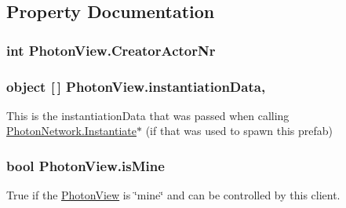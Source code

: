 \subsection{Property Documentation}
\subsubsection[{\texorpdfstring{Creator\+Actor\+Nr}{CreatorActorNr}}]{\setlength{\rightskip}{0pt plus 5cm}int Photon\+View.\+Creator\+Actor\+Nr\hspace{0.3cm}{\ttfamily [get]}}\hypertarget{class_photon_view_aa9d1d25847f25afbac6b68c99c7e286c}{}\label{class_photon_view_aa9d1d25847f25afbac6b68c99c7e286c}
\subsubsection[{\texorpdfstring{instantiation\+Data}{instantiationData}}]{\setlength{\rightskip}{0pt plus 5cm}object \mbox{[}$\,$\mbox{]} Photon\+View.\+instantiation\+Data\hspace{0.3cm}{\ttfamily [get]}, {\ttfamily [set]}}\hypertarget{class_photon_view_a0d1e63579ed533e6394ca7f12b313c7c}{}\label{class_photon_view_a0d1e63579ed533e6394ca7f12b313c7c}


This is the instantiation\+Data that was passed when calling \hyperlink{class_photon_network_a843d9f62d28ab123c83291c1e6bb857d}{Photon\+Network.\+Instantiate}$\ast$ (if that was used to spawn this prefab) 

\subsubsection[{\texorpdfstring{is\+Mine}{isMine}}]{\setlength{\rightskip}{0pt plus 5cm}bool Photon\+View.\+is\+Mine\hspace{0.3cm}{\ttfamily [get]}}\hypertarget{class_photon_view_a823593ba0cf86454176b4f0d04a70590}{}\label{class_photon_view_a823593ba0cf86454176b4f0d04a70590}


True if the \hyperlink{class_photon_view}{Photon\+View} is \char`\"{}mine\char`\"{} and can be controlled by this client. 

